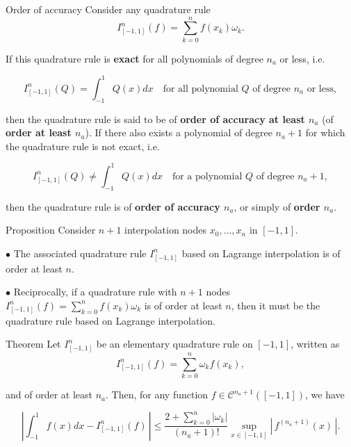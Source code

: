 \documentclass{article}
\begin{document}
        \vspace{10pt}

        \begin{definition}{Order of accuracy}
            Consider any quadrature rule
            $$
            I^n_{[-1,1]} (f) = \sum_{k=0}^n f(x_k) \omega_k.
            $$
            
            If this quadrature rule is \textbf{exact} for all polynomials of degree $n_a$ or less, i.e.
            
            $$
            I^n_{[-1,1]} (Q) = \int_{-1}^1 Q(x) dx \quad{} \text{for all polynomial }Q\text{ of degree }n_a\text{ or less},
            $$
            
            then the quadrature rule is said to be of \textbf{order of accuracy at least $n_a$} (of \textbf{order at least $n_a$}). If there also exists a polynomial of degree $n_a+1$ for which the quadrature rule is not exact, i.e.
            
            $$
            I^n_{[-1,1]} (Q) \neq \int_{-1}^1 Q(x) dx \quad{} \text{for a polynomial }Q\text{ of degree }n_a+1,
            $$
            
            then the quadrature rule is of \textbf{order of accuracy $n_a$}, or simply of \textbf{order $n_a$}.
        \end{definition}

        \vspace{10pt}

        \begin{theorem}{Proposition}
            Consider $n+1$ interpolation nodes $x_0,\ldots,x_n$ in $[-1,1]$.

            \vspace{8pt}

            $\bullet$ The associated quadrature rule $I^n_{[-1,1]}$ based on Lagrange interpolation is of order at least $n$.

            \vspace{4pt}
            
            $\bullet$ Reciprocally, if a quadrature rule with $n+1$ nodes $I^n_{[-1,1]} (f) = \displaystyle \sum_{k=0}^n f(x_k) \omega_k$ is of order at least $n$, then it must be the quadrature rule based on Lagrange interpolation.
        \end{theorem}

        \begin{theorem}{Theorem}
            Let $I^n_{[-1,1]}$ be an elementary quadrature rule on $[-1,1]$, written as
            $$
            I^n_{[-1,1]}(f) = \sum_{k=0}^n \omega_k f(x_k),
            $$
            
            and of order at least $n_a$. Then, for any function $f\in \mathcal{C}^{n_a+1}([-1,1])$, we have
            
            $$
            \left\vert \int_{-1}^{1} f(x)dx - I^n_{[-1,1]}(f)\,\right\vert \leq \frac{2+\sum_{k=0}^n |\omega_k| }{(n_a+1)!}\sup_{x\in [-1,1]} \left\vert \,f^{(n_a+1)}(x)\,\right\vert.
            $$
        \end{theorem}
\end{document}
